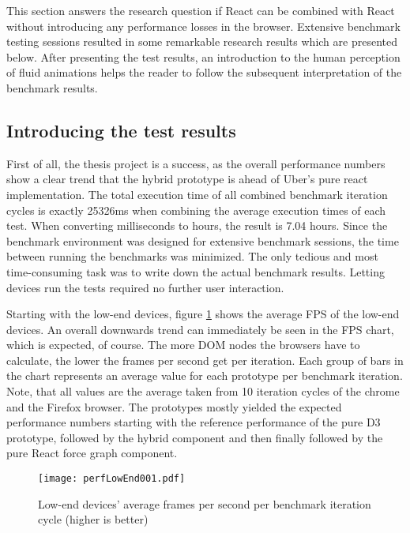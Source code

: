 This section answers the research question if React can be combined with React without introducing any performance losses in the browser. Extensive benchmark testing sessions resulted in some remarkable research results which are presented below. After presenting the test results, an introduction to the human perception of fluid animations helps the reader to follow the subsequent interpretation of the benchmark results.

\subsection{Introducing the test results}

First of all, the thesis project is a success, as the overall performance numbers show a clear trend that the hybrid prototype is ahead of Uber's pure react implementation. The total execution time of all combined benchmark iteration cycles is exactly 25326ms when combining the average execution times of each test. When converting milliseconds to hours, the result is 7.04 hours. Since the benchmark environment was designed for extensive benchmark sessions, the time between running the benchmarks was minimized. The only tedious and most time-consuming task was to write down the actual benchmark results. Letting devices run the tests required no further user interaction. 

Starting with the low-end devices, figure \ref{fig:perfLowEnd001} shows the average FPS of the low-end devices. An overall downwards trend can immediately be seen in the FPS chart, which is expected, of course. The more DOM nodes the browsers have to calculate, the lower the frames per second get per iteration. Each group of bars in the chart represents an average value for each prototype per benchmark iteration. Note, that all values are the average taken from 10 iteration cycles of the chrome and the Firefox browser. The prototypes mostly yielded the expected performance numbers starting with the reference performance of the pure D3 prototype, followed by the hybrid component and then finally followed by the pure React force graph component.

\begin{figure}
\centering
\texttt{[image: perfLowEnd001.pdf]}
\caption{Low-end devices' average frames per second per benchmark iteration cycle (higher is better)}
\label{fig:perfLowEnd001}
\end{figure}

